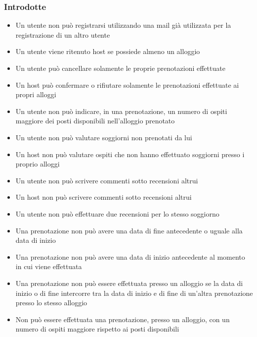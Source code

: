 \subsubsection{Introdotte}
\begin{itemize}
  \item Un utente non può registrarsi utilizzando una mail già utilizzata per la registrazione di un altro utente
  \item Un utente viene ritenuto host se possiede almeno un alloggio
  \item Un utente può cancellare solamente le proprie prenotazioni effettuate
  \item Un host può confermare o rifiutare solamente le prenotazioni effettuate ai propri alloggi
  \item Un utente non può indicare, in una prenotazione, un numero di ospiti maggiore dei posti disponibili nell'alloggio prenotato
  \item Un utente non può valutare soggiorni non prenotati da lui
  \item Un host non può valutare ospiti che non hanno effettuato soggiorni presso i proprio alloggi
  \item Un utente non può scrivere commenti sotto recensioni altrui
  \item Un host non può scrivere commenti sotto recensioni altrui
  \item Un utente non può effettuare due recensioni per lo stesso soggiorno
  \item Una prenotazione non può avere una data di fine antecedente o uguale alla data di inizio
  \item Una prenotazione non può avere una data di inizio antecedente al momento in cui viene effettuata
  \item Una prenotazione non può essere effettuata presso un alloggio se la data di inizio o di fine intercorre tra la data di inizio e di fine di un'altra prenotazione presso lo stesso alloggio
  \item Non può essere effettuata una prenotazione, presso un alloggio, con un numero di ospiti maggiore rispetto ai posti disponibili
\end{itemize}